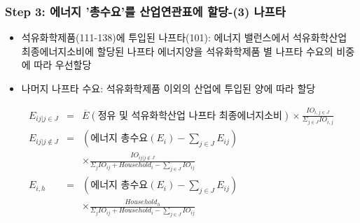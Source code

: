 \documentclass[10pt,compress,slidetop,%
			   hyperref={unicode},xcolor={svgnames},%
			   t]{beamer}
\begin{document}
\begin{frame}
	\frametitle{Step 3: 에너지 '총수요'를 산업연관표에 할당-(3) 나프타   }
\bigskip
\begin{small}
\begin{itemize}
\item{석유화학제품(111-138)에 투입된 나프타(101): 에너지 밸런스에서 석유화학산업 최종에너지소비에 할당된 나프타 에너지양을 석유화학제품 별 나프타 수요의 비중에 따라 우선할당}
\item{나머지 나프타 수요: 석유화학제품 이외의 산업에 투입된 양에 따라 할당}
\end{itemize}
\smallskip

\begin{eqnarray*}
E_{ij|j\in J}&=&\overline{E}(\mbox{정유 및 석유화학산업 나프타 최종에너지소비})\times\frac{IO_{i,j\in J}}{\Sigma_{j\in J}IO_{i,j}}\\
E_{ij|j \notin J}&=&(\mbox{에너지 총수요}(E_i)-\sum_{j\in J}E_{ij})\\
& &\times\frac{IO_{ij| j \notin J}}{\Sigma_{j}IO_{ij}+Household_i-\sum_{j\in J}IO_{ij}}\\
E_{i,h}&=&(\mbox{에너지 총수요}(E_i)-\sum_{j\in J}E_{ij})\\
& &\times\frac{Household_h}{\Sigma_{j}IO_{ij}+Household_i-\sum_{j\in J}IO_{ij}}
\end{eqnarray*}
\end{small}


\end{frame}
\end{document}
